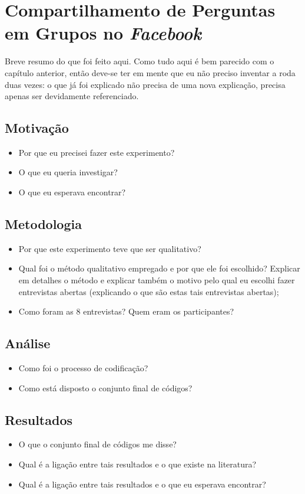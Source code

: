 \chapter{Compartilhamento de Perguntas em Grupos no \textit{Facebook}}

Breve resumo do que foi feito aqui. Como tudo aqui é bem parecido com o capítulo anterior, então deve-se ter em mente que eu não preciso inventar a roda duas vezes: o que já foi explicado não precisa de uma nova explicação, precisa apenas ser devidamente referenciado.
\section{Motivação}
\begin{itemize}
\item Por que eu precisei fazer este experimento? 
\item O que eu queria investigar?
\item O que eu esperava encontrar?
\end{itemize}
\section{Metodologia}
\begin{itemize}
\item Por que este experimento teve que ser qualitativo?
\item Qual foi o método qualitativo empregado e por que ele foi escolhido? Explicar em detalhes o método e explicar também o motivo pelo qual eu escolhi fazer entrevistas abertas (explicando o que são estas tais entrevistas abertas);
\item Como foram as 8 entrevistas? Quem eram os participantes?
\end{itemize}
\section{Análise}
\begin{itemize}
\item Como foi o processo de codificação?
\item Como está disposto o conjunto final de códigos?
\end{itemize}
\section{Resultados}
\begin{itemize}
\item O que o conjunto final de códigos me disse?
\item Qual é a ligação entre tais resultados e o que existe na literatura?
\item Qual é a ligação entre tais resultados e o que eu esperava encontrar?
\end{itemize}
